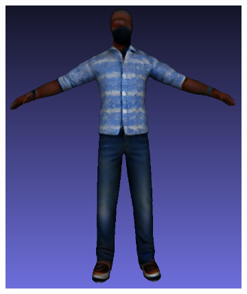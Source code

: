 \begin{figure}[ht]
    \centering
    \small
    \begin{subfigure}[b]{0.23\textwidth}
        \centering
        \includegraphics[width=\textwidth]{etc/bias/bias_poor_genie_1.png}
        \caption{}
    \end{subfigure}
    \begin{subfigure}[b]{0.1721\textwidth}
        \centering

\end{subfigure}
\end{figure}

